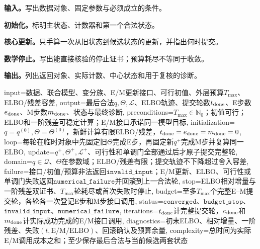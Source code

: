 \begin{keypointbox}[title={算法执行契约：五步阅读}]
\textbf{输入。}写出数据对象、固定参数与必须成立的条件。\par
\textbf{初始化。}标明主状态、计数器和第一个合法状态。\par
\textbf{核心更新。}只手算一次从旧状态到候选状态的更新，并指出何时提交。\par
\textbf{数学停止。}写出能直接核验的停止证书；预算耗尽不等同于收敛。\par
\textbf{输出。}列出返回对象、实际计数、中心状态和用于复核的诊断。
\end{keypointbox}

\begin{AlgorithmContract}{
  input={数据、联合模型、变分族、E/M更新接口、可行初值、外层预算$T_{\max}$、ELBO/残差容差},
  output={最后合法$q,\Theta,\mathcal L$、ELBO轨迹、提交轮数$t_{\rm done}$、E步数$e_{\rm done}$、M步数$m_{\rm done}$、状态与最终诊断},
  preconditions={$T_{\max}\in\mathbb N_0$；初值可行；ELBO和一阶残差可稳定计算；E/M接口承诺同一模型目标},
  initialization={$q=q^{(0)},\Theta=\Theta^{(0)}$，新鲜计算有限ELBO/残差，$t_{\rm done}=e_{\rm done}=m_{\rm done}=0$},
  loop={每轮在临时对象中先固定旧$\Theta$完成E步，再固定新$q^+$完成M步并复算同一ELBO},
  update={$q^+,\Theta^+,\mathcal L^+$、可行性和单调门全部通过后才原子提交完整轮},
  domain={$q\in\mathcal Q$、$\Theta$在参数域；ELBO/残差有限；提交轨迹不下降超过舍入容差},
  failure={接口/初值/预算非法返回$\mathtt{invalid\_input}$；E/M更新、ELBO、可行性或单调门失败返回$\mathtt{numerical\_failure}$并回滚到上一合法轮},
  stop={ELBO相对增量与一阶残差双证书、$T_{\max}$轮耗尽或首次失败时停止},
  budget={至多$T_{\max}$个完整E--M提交轮，各轮各一次登记E步和M步接口调用},
  status={$\mathtt{converged}$、$\mathtt{budget\_stop}$、$\mathtt{invalid\_input}$、$\mathtt{numerical\_failure}$},
  iterations={$t_{\rm done}$计完整提交轮，$e_{\rm done}$和$m_{\rm done}$计实际成功完成的E/M接口调用},
  diagnostics={初末ELBO、相对增量、一阶残差、失败$(t,\mathrm{E/M/ELBO})$、回滚确认及预算余量},
  complexity={总时间为实际E/M调用成本之和；至少保存最后合法与当前候选两套状态}
}
\label{alg:V5-C06-generic-vem}
\end{AlgorithmContract}

